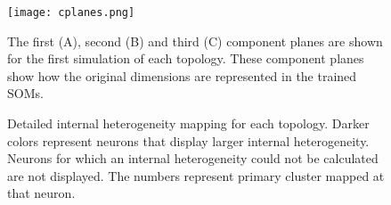 \begin{figure}
\begin{minipage}{\textwidth}
  \texttt{[image: cplanes.png]}
  \caption{The first (A), second (B) and third (C) component planes are shown
for the first simulation of each topology.  These component planes show how
the original dimensions are represented in the trained SOMs.}
  \label{cplanes}
\end{minipage}\end{figure}


\begin{figure}
\centering
\begin{minipage}{\textwidth}
\caption{Detailed internal heterogeneity mapping for each topology. Darker colors
represent neurons that display larger internal heterogeneity. Neurons for which
an internal heterogeneity could not be calculated are not displayed. The numbers
represent primary cluster mapped at that neuron.}
\label{cluster}
\end{minipage}
\end{figure}




